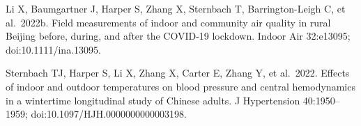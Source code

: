 \documentclass[
  letterpaper,
  DIV=11,
  numbers=noendperiod]{scrartcl}
\begin{document}
Li X, Baumgartner J, Harper S, Zhang X, Sternbach T, Barrington-Leigh C,
et al.~2022b. Field measurements of indoor and community air quality in
rural Beijing before, during, and after the COVID-19 lockdown. Indoor
Air 32:e13095; doi:10.1111/ina.13095.

Sternbach TJ, Harper S, Li X, Zhang X, Carter E, Zhang Y, et al.~2022.
Effects of indoor and outdoor temperatures on blood pressure and central
hemodynamics in a wintertime longitudinal study of Chinese adults. J
Hypertension 40:1950--1959; doi:10.1097/HJH.0000000000003198.
\end{document}
